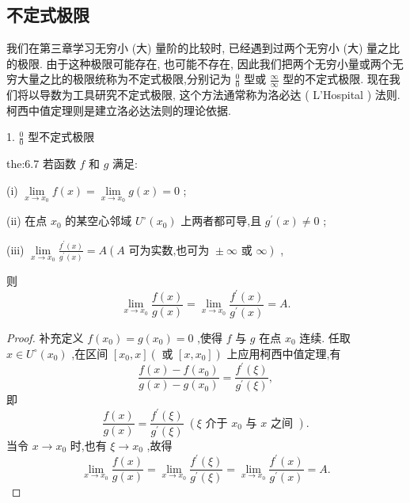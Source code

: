 \subsection{不定式极限}

我们在第三章学习无穷小 (大) 量阶的比较时, 已经遇到过两个无穷小 (大) 量之比的极限. 由于这种极限可能存在, 也可能不存在, 因此我们把两个无穷小量或两个无穷大量之比的极限统称为不定式极限,分别记为 \(\frac{0}{0}\) 型或 \(\frac{\infty }{\infty }\) 型的不定式极限. 现在我们将以导数为工具研究不定式极限, 这个方法通常称为洛必达 ( L'Hospital ) 法则. 柯西中值定理则是建立洛必达法则的理论依据.

1. \(\frac{0}{0}\) 型不定式极限

\begin{theorem}{}{the:6.7}
若函数 \(f\) 和 \(g\) 满足:

(i) \(\mathop{\lim }\limits_{{x \rightarrow  {x}_{0}}}f\left( x\right)  = \mathop{\lim }\limits_{{x \rightarrow  {x}_{0}}}g\left( x\right)  = 0\) ;

(ii) 在点 \({x}_{0}\) 的某空心邻域 \({U}^{ \circ  }\left( {x}_{0}\right)\) 上两者都可导,且 \({g}^{\prime }\left( x\right)  \neq  0\) ;

(iii) \(\mathop{\lim }\limits_{{x \rightarrow  {x}_{0}}}\frac{{f}^{\prime }\left( x\right) }{{g}^{\prime }\left( x\right) } = A\left( {A\text{ 可为实数,也可为 } \pm  \infty \text{ 或 }\infty }\right)\) ,

则
\[
\mathop{\lim }\limits_{{x \rightarrow  {x}_{0}}}\frac{f\left( x\right) }{g\left( x\right) } = \mathop{\lim }\limits_{{x \rightarrow  {x}_{0}}}\frac{{f}^{\prime }\left( x\right) }{{g}^{\prime }\left( x\right) } = A.
\]
\end{theorem}

\begin{proof}
补充定义 \(f\left( {x}_{0}\right)  = g\left( {x}_{0}\right)  = 0\) ,使得 \(f\) 与 \(g\) 在点 \({x}_{0}\) 连续. 任取 \(x \in  {U}^{ \circ  }\left( {x}_{0}\right)\) ,在区间 \(\left\lbrack  {{x}_{0},x}\right\rbrack  \left( {\text{ 或 }\left\lbrack  {x,{x}_{0}}\right\rbrack  }\right)\) 上应用柯西中值定理,有
\[
\frac{f\left( x\right)  - f\left( {x}_{0}\right) }{g\left( x\right)  - g\left( {x}_{0}\right) } = \frac{{f}^{\prime }\left( \xi \right) }{{g}^{\prime }\left( \xi \right) },
\]
即
\[
\frac{f\left( x\right) }{g\left( x\right) } = \frac{{f}^{\prime }\left( \xi \right) }{{g}^{\prime }\left( \xi \right) }\;\left( {\xi \text{ 介于 }{x}_{0}\text{ 与 }x\text{ 之间 }}\right) .
\]
当令 \(x \rightarrow  {x}_{0}\) 时,也有 \(\xi  \rightarrow  {x}_{0}\) ,故得
\[
\mathop{\lim }\limits_{{x \rightarrow  {x}_{0}}}\frac{f\left( x\right) }{g\left( x\right) } = \mathop{\lim }\limits_{{x \rightarrow  {x}_{0}}}\frac{{f}^{\prime }\left( \xi \right) }{{g}^{\prime }\left( \xi \right) } = \mathop{\lim }\limits_{{x \rightarrow  {x}_{0}}}\frac{{f}^{\prime }\left( x\right) }{{g}^{\prime }\left( x\right) } = A.
\]
\end{proof}

